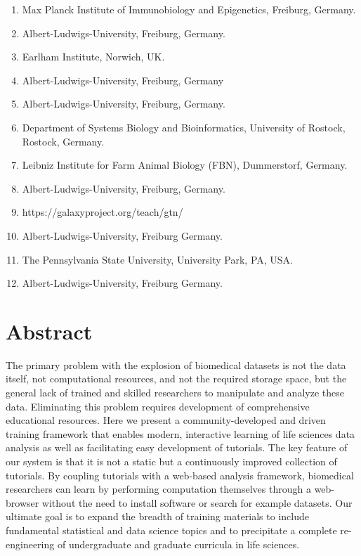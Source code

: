 \begin{enumerate}
\item Max Planck Institute of Immunobiology and Epigenetics, Freiburg, Germany.
\item Albert-Ludwigs-University, Freiburg, Germany.
\item Earlham Institute, Norwich, UK.
\item Albert-Ludwigs-University, Freiburg, Germany
\item Albert-Ludwigs-University, Freiburg, Germany.
\item Department of Systems Biology and Bioinformatics, University of Rostock, Rostock, Germany.
\item Leibniz Institute for Farm Animal Biology (FBN), Dummerstorf, Germany.
\item Albert-Ludwigs-University, Freiburg, Germany.
\item https://galaxyproject.org/teach/gtn/
\item Albert-Ludwigs-University, Freiburg  Germany.
\item The Pennsylvania State University, University Park, PA, USA.
\item Albert-Ludwigs-University, Freiburg Germany.
\end{enumerate}
\normalsize

\section*{Abstract}
The primary problem with the explosion of biomedical datasets is not the data itself, not computational resources, and not the required storage space, but the general lack of trained and skilled researchers to manipulate and analyze these data. Eliminating this problem requires development of comprehensive educational resources. Here we present a community-developed and driven training framework that enables modern, interactive learning of life sciences data analysis as well as facilitating easy development of tutorials. The key feature of our system is that it is not a static but a continuously improved collection of tutorials. By coupling tutorials with a web-based analysis framework, biomedical researchers can learn by performing computation themselves through a web-browser without the need to install software or search for example datasets. Our ultimate goal is to expand the breadth of training materials to include fundamental statistical and data science topics and to precipitate a complete re-engineering of undergraduate and graduate curricula in life sciences.

